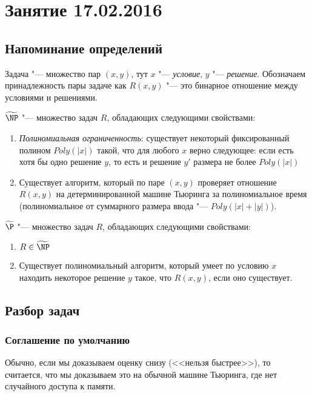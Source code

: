 \chapter{Занятие 17.02.2016}
\section{Напоминание определений}

\begin{Def}
	Задача "--- множество пар $(x, y)$, тут $x$ "--- \textit{условие}, $y$ "--- \textit{решение}.
	Обозначаем принадлежность пары задаче как $R(x, y)$ "--- это бинарное отношение между
	условиями и решениями.
\end{Def}

\begin{Def}
	$\widetilde{\NP}$ "--- множество задач $R$, обладающих следующими свойствами:
	\begin{enumerate}
		\item
			\textit{Полиномиальная ограниченность}: существует некоторый фиксированный
			полином $Poly(|x|)$ такой, что для любого $x$ верно следующее:
			если есть хотя бы одно решение $y$, то есть и решение $y'$ размера не более
			$Poly(|x|)$
		\item
			Существует алгоритм, который по паре $(x, y)$ проверяет отношение $R(x, y)$
			на детерминированной машине Тьюринга за полиномиальное время (полиномиальное
			от суммарного размера ввода "--- $Poly(|x| + |y|)$).
	\end{enumerate}
\end{Def}

\begin{Def}
	$\widetilde{\P}$ "--- множество задач $R$, обладающих следующими свойствами:
	\begin{enumerate}
		\item $R \in \widetilde{\NP}$
		\item
			Существует полиномиальный алгоритм, который умеет по условию $x$ находить некоторое
			решение $y$ такое, что $R(x, y)$, если оно существует.
	\end{enumerate}
\end{Def}

\section{Разбор задач}
\subsection{Соглашение по умолчанию}
	Обычно, если мы доказываем оценку снизу (<<нельзя быстрее>>), то считается, что
	мы доказываем это на обычной машине Тьюринга, где нет случайного доступа к памяти.

